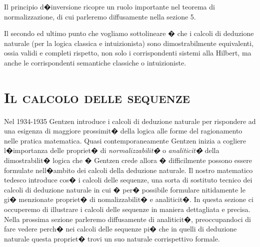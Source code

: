 \documentclass[a4paper,12pt]{aphex}
\begin{document}
\noindent Il principio d�inversione ricopre un ruolo importante nel teorema di normalizzazione, di cui parleremo diffusamente nella sezione 5.


 Il secondo ed ultimo punto che vogliamo sottolineare � che i calcoli di deduzione naturale (per la logica classica e intuizionista) sono dimostrabilmente equivalenti, ossia validi e completi rispetto, non solo i corrispondenti sistemi alla Hilbert, ma anche le corrispondenti semantiche classiche o intuizioniste.

\section{\textsc{Il calcolo delle sequenze}}


 
Nel 1934-1935 Gentzen introduce i calcoli di deduzione naturale per rispondere ad una esigenza di maggiore prossimit� della logica alle forme del ragionamento nelle pratica matematica. Quasi contemporaneamente Gentzen inizia a cogliere l�importanza delle propriet� di \emph{normalizzabilit�} o \emph{analiticit�} della dimostrabilit� logica che � Gentzen crede allora � difficilmente possono essere formulate nell�ambito dei calcoli della deduzione naturale. Il nostro matematico tedesco introduce cos� i calcoli delle sequenze, una sorta di sostituto tecnico dei calcoli di deduzione naturale in cui � per� possibile formulare nitidamente le gi� menzionate propriet� di nomalizzabilit� e analiticit�. 
In questa sezione ci occuperemo di illustrare i calcoli delle sequenze in maniera dettagliata e precisa. Nella prossima sezione parleremo diffusamente di analiticit�, preoccupandoci di fare vedere perch� nei calcoli delle sequenze pi� che in quelli di deduzione naturale questa propriet� trovi un suo naturale corrispettivo formale.
 
\end{document}

